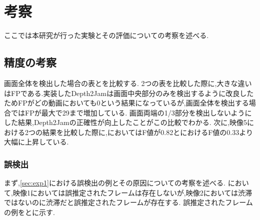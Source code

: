 \chapter{考察}
ここでは本研究が行った実験とその評価についての考察を述べる.
\section{精度の考察}
画面全体を検出した場合の表とを比較する.
2つの表を比較した際に,大きな違いはFPである.実装したDepth2Jamは画面中央部分のみを検出するように改良したためFPがどの動画においても0という結果になっているが,画面全体を検出する場合ではFPが最大で29まで増加している.
画面両端の1/3部分を検出しないようにした結果,Depth2Jamの正確性が向上したことがこの比較でわかる.
次に,映像5における2つの結果を比較した際に,においてはF値が0.82とにおけるF値の0.33より大幅に上昇している.

\subsection{誤検出}
まず,\ref{sec:exp1}における誤検出の例とその原因についての考察を述べる.
において,映像1においては誤推定されたフレームは存在しないが,映像2においては渋滞ではないのに渋滞だと誤推定されたフレームが存在する.
誤推定されたフレームの例をとに示す.

